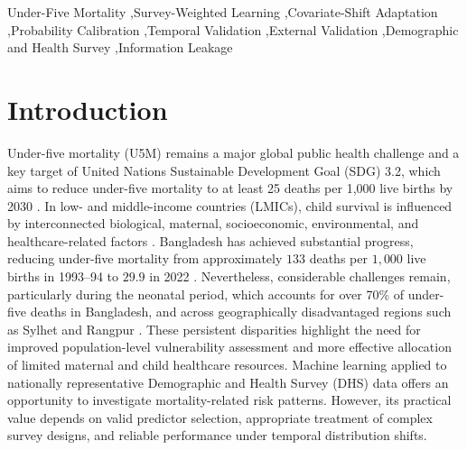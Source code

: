 \documentclass[a4paper,fleqn]{cas-sc}
\begin{document}
\begin{keywords}
Under-Five Mortality \sep Survey-Weighted Learning \sep Covariate-Shift Adaptation \sep Probability Calibration \sep Temporal Validation \sep External Validation \sep Demographic and Health Survey \sep Information Leakage
\end{keywords}

{\hfuzz=120pt\maketitle}


\section{Introduction}
\label{sec:introduction}

Under-five mortality (U5M) remains a major global public health challenge and a key target of United Nations Sustainable Development Goal (SDG) 3.2, which aims to reduce under-five mortality to at least 25 deaths per 1,000 live births by 2030 \cite{who2023,unicef2023,black2010,you2015}. In low- and middle-income countries (LMICs), child survival is influenced by interconnected biological, maternal, socioeconomic, environmental, and healthcare-related factors \cite{chowdhury2013,arifeen2013,omran2005}. Bangladesh has achieved substantial progress, reducing under-five mortality from approximately $133$ deaths per $1{,}000$ live births in 1993--94 to $29.9$ in 2022 \cite{niport2024}. Nevertheless, considerable challenges remain, particularly during the neonatal period, which accounts for over 70\% of under-five deaths in Bangladesh, and across geographically disadvantaged regions such as Sylhet and Rangpur \cite{khan2017,khan2021,mazumder2024causes,mazumder2024stagnant}. These persistent disparities highlight the need for improved population-level vulnerability assessment and more effective allocation of limited maternal and child healthcare resources. Machine learning applied to nationally representative Demographic and Health Survey (DHS) data offers an opportunity to investigate mortality-related risk patterns. However, its practical value depends on valid predictor selection, appropriate treatment of complex survey designs, and reliable performance under temporal distribution shifts.
\end{document}
